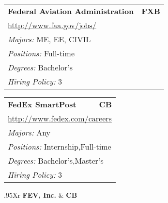 \documentclass[twoside]{article}
\begin{document}
\begin{center}
\begin{multicols}{3}
\begin{FlushLeft}
\begin{minipage}{.9\columnwidth}
\end{minipage}
 
\begin{minipage}{.9\columnwidth}\begin{tabularx}{.95\columnwidth}{Xr}
                 {\Large\bf Federal Aviation Administration} & {\Large\bf FXB}\\
    \multicolumn{2}{p{.95\columnwidth}}{\url{http://www.faa.gov/jobs/}}\\
    \multicolumn{2}{p{.95\columnwidth}}{\emph{Majors:} ME, EE, CIVIL}\\
    \multicolumn{2}{p{.95\columnwidth}}{\emph{Positions:} Full-time}\\
    \multicolumn{2}{p{.95\columnwidth}}{\emph{Degrees:} Bachelor's}\\
    \multicolumn{2}{p{.95\columnwidth}}{\emph{Hiring Policy:} 3}\\
    \end{tabularx}
    
\end{minipage}
 
\begin{minipage}{.9\columnwidth}\begin{tabularx}{.95\columnwidth}{Xr}
                 {\Large\bf FedEx SmartPost} & {\Large\bf CB}\\
    \multicolumn{2}{p{.95\columnwidth}}{\url{http://www.fedex.com/careers}}\\
    \multicolumn{2}{p{.95\columnwidth}}{\emph{Majors:} Any}\\
    \multicolumn{2}{p{.95\columnwidth}}{\emph{Positions:} Internship,Full-time}\\
    \multicolumn{2}{p{.95\columnwidth}}{\emph{Degrees:} Bachelor's,Master's}\\
    \multicolumn{2}{p{.95\columnwidth}}{\emph{Hiring Policy:} 3}\\
    \end{tabularx}
    
\end{minipage}
 
\begin{minipage}{.9\columnwidth}\begin{tabularx}{.95\columnwidth}{Xr}
                 {\Large\bf FEV, Inc.} & {\Large\bf CB}\\
    \\
    \\
    \\
    \\
    \\
    \end{tabularx}
    

\end{minipage}
\end{FlushLeft}
\end{multicols}
\end{center}
\end{document}
